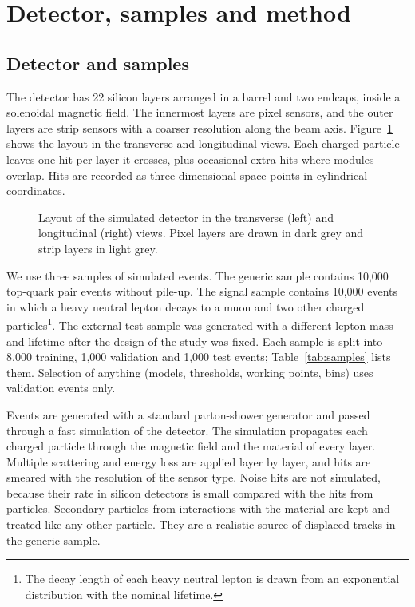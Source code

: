 \section{Detector, samples and method}
\label{sec:method}

\subsection{Detector and samples}
\label{sec:detector}

The detector has 22 silicon layers arranged in a barrel and two endcaps, inside a solenoidal magnetic field. The innermost layers are pixel sensors, and the outer layers are strip sensors with a coarser resolution along the beam axis. Figure~\ref{fig:detector} shows the layout in the transverse and longitudinal views. Each charged particle leaves one hit per layer it crosses, plus occasional extra hits where modules overlap. Hits are recorded as three-dimensional space points in cylindrical coordinates.

\begin{figure}[tbp]
  \centering
  \caption{Layout of the simulated detector in the transverse (left) and longitudinal (right) views. Pixel layers are drawn in dark grey and strip layers in light grey.}
  \label{fig:detector}
\end{figure}

We use three samples of simulated events. The generic sample contains 10,000 top-quark pair events without pile-up. The signal sample contains 10,000 events in which a heavy neutral lepton decays to a muon and two other charged particles\footnote{The decay length of each heavy neutral lepton is drawn from an exponential distribution with the nominal lifetime.}. The external test sample was generated with a different lepton mass and lifetime after the design of the study was fixed. Each sample is split into 8,000 training, 1,000 validation and 1,000 test events; Table~\ref{tab:samples} lists them. Selection of anything (models, thresholds, working points, bins) uses validation events only.

Events are generated with a standard parton-shower generator and passed through a fast simulation of the detector. The simulation propagates each charged particle through the magnetic field and the material of every layer. Multiple scattering and energy loss are applied layer by layer, and hits are smeared with the resolution of the sensor type. Noise hits are not simulated, because their rate in silicon detectors is small compared with the hits from particles. Secondary particles from interactions with the material are kept and treated like any other particle. They are a realistic source of displaced tracks in the generic sample.

